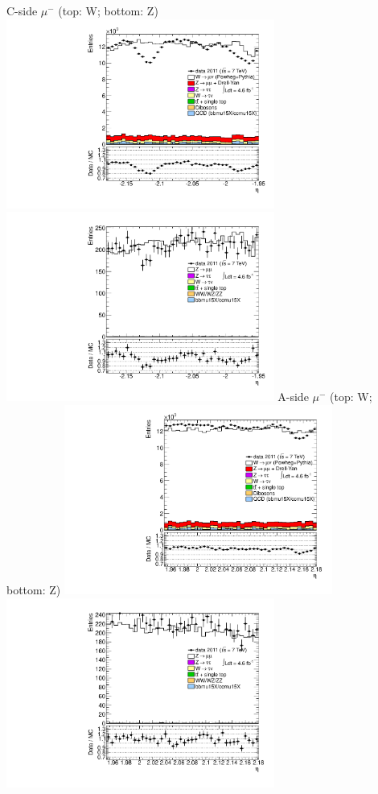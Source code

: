  {
\colb[T]
C-side $\mu^{-}$ (top: W; bottom: Z)
\centering
\includegraphics[width=0.66\textwidth]{dates/20130306/figures/etaphi/W_10_C_stack_l_eta_POS} \\
\includegraphics[width=0.66\textwidth]{dates/20130306/figures/etaphi/Ztinv_10_C_stack_lP_eta_ALL.pdf}
A-side $\mu^{-}$ (top: W; bottom: Z)
\centering
\includegraphics[width=0.66\textwidth]{dates/20130306/figures/etaphi/W_10_A_stack_l_eta_POS} \\
\includegraphics[width=0.66\textwidth]{dates/20130306/figures/etaphi/Ztinv_10_A_stack_lP_eta_ALL.pdf} 
\cole
}

